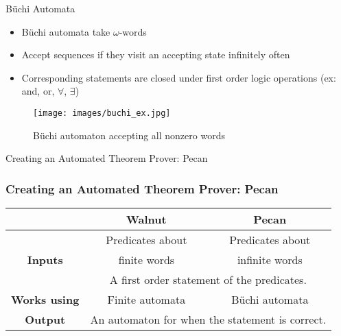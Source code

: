 \documentclass[leqno,presentation]{beamer}
\begin{document}
\begin{frame}{B\"uchi Automata}
    \begin{itemize}
          \item B\"uchi automata take $\omega$-words
          \item Accept sequences if they visit an accepting state infinitely often
          \item Corresponding statements are closed under first order logic operations (ex: and, or, $\forall$, $\exists$)
      \end{itemize}
       \begin{figure}
            \centering
            \texttt{[image: images/buchi\_ex.jpg]}
            \caption{B\"uchi automaton accepting all nonzero words}
        \end{figure}
\end{frame}


\begin{frame}{Creating an Automated Theorem Prover: Pecan}
    \frametitle{Creating an Automated Theorem Prover: Pecan}
    
\begin{table}[]
\begin{tabular}{|c|c|c|}
\hline
& \textbf{Walnut}  & \textbf{Pecan} \\ \hline
\multirow{3}{*}{\textbf{Inputs}}       & Predicates about & Predicates about \\

  & finite words    & infinite words \\\cline{2-3}
  & \multicolumn{2}{c|}{A first order statement of the predicates.} \\\hline

\textbf{Works using}                   & Finite automata  & B\"uchi automata   \\\hline
\textbf{Output} & \multicolumn{2}{c|}{An automaton for when the statement is correct. }\\\hline
\end{tabular}
\end{table}
    
\end{frame}
\end{document}

